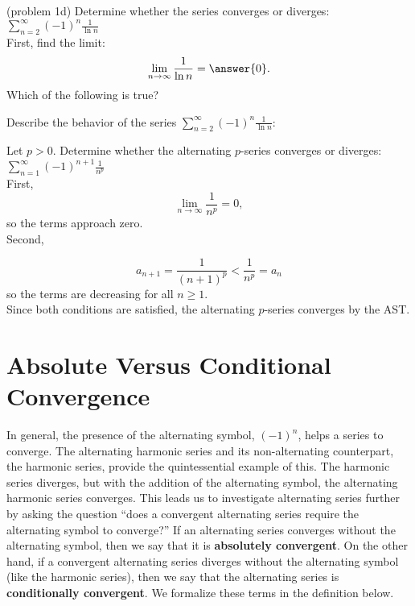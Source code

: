 \documentclass[handout]{ximera}
\begin{document}
\begin{problem}(problem 1d)
Determine whether the series converges or 
diverges: $\displaystyle{\sum_{n=2}^\infty (-1)^n \frac{1}{\ln n}}$\\
First, find the limit:
\[
\lim_{n\to\infty} \frac{1}{\ln n} = \answer{0}.
\]
Which of the following is true?
\begin{multipleChoice}
\end{multipleChoice}


Describe the behavior of the series $\displaystyle{\sum_{n=2}^\infty (-1)^n \frac{1}{\ln n}:}$
\begin{multipleChoice}
\end{multipleChoice}

\end{problem}



\begin{example}[example 2]
Let $p > 0$. Determine whether the alternating $p$-series converges or diverges: 
$\displaystyle{\sum_{n=1}^\infty (-1)^{n+1} \frac{1}{n^p}}$ \\
First, 
\[
\lim_{n\to\infty} \frac{1}{n^p} = 0,
\]
so the terms approach zero.\\
Second,

\[
a_{n+1} = \frac{1}{(n+1)^p} < \frac{1}{n^p} = a_n
\]
so the terms are decreasing for all $n \geq 1$. \\
Since both conditions are satisfied, the alternating $p$-series converges by the AST.
\end{example}

\section{Absolute Versus Conditional Convergence}
In general, the presence of the alternating symbol, $(-1)^n$, helps a series to converge. The alternating harmonic series and its non-alternating counterpart, the harmonic series, provide the quintessential example of this.
The harmonic series diverges, but with the addition of the alternating symbol, the alternating harmonic series converges. 
This leads us to investigate alternating series further by asking the question ``does a convergent alternating series require the alternating symbol to converge?''
If an alternating series converges without the alternating symbol, then we say that it is \textbf{absolutely convergent}.  On the other hand, if a convergent alternating series
diverges without the alternating symbol (like the harmonic series), then we say that the alternating series is \textbf{conditionally convergent}.
We formalize these terms in the definition below.
\end{document}

